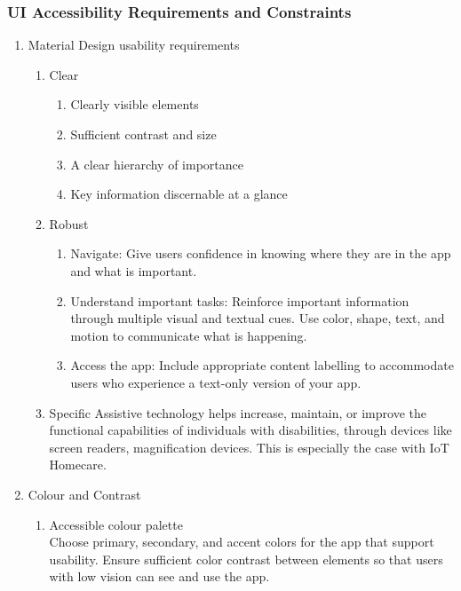 \subsubsection{UI Accessibility Requirements and Constraints}
     \begin{enumerate}
   \item Material Design usability requirements

   		\begin{enumerate}
    		\item{Clear}
            	\begin{enumerate}
                	\item{Clearly visible elements}
                    \item{Sufficient contrast and size}
                    \item{A clear hierarchy of importance}
                    \item{Key information discernable at a glance}
            	\end{enumerate}
        	\item{Robust}
            	\begin{enumerate}
                	\item{Navigate: Give users confidence in knowing where they are in the app and what is important.}
                    \item{Understand important tasks: Reinforce important information through multiple visual and textual cues. Use color, shape, text, and motion to communicate what is happening.}
                    \item{Access the app: Include appropriate content labelling to accommodate users who experience a text-only version of your app.}
            	\end{enumerate}
        	\item{Specific}
            Assistive technology helps increase, maintain, or improve the functional capabilities of individuals with disabilities, through devices like screen readers, magnification devices. This is especially the case with IoT Homecare.
        \end{enumerate}
   \item Colour and Contrast
     \begin{enumerate}
       \item Accessible colour palette\\
       Choose primary, secondary, and accent colors for the app that support usability. Ensure sufficient color contrast between elements so that users with low vision can see and use the app.


\end{enumerate}
\end{enumerate}
